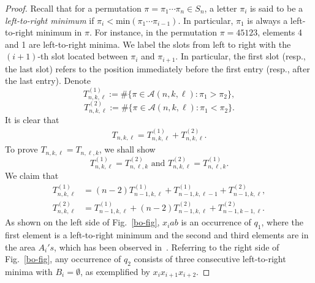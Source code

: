 \documentclass[12pt]{article}
\newcommand{\A}{\mathcal{A}}
\begin{document}
\begin{proof}
Recall that for a  permutation $\pi = \pi_1 \cdots \pi_n \in S_n$, a letter $\pi_i$ is said to be  a {\em left-to-right minimum} if $\pi_i < \mbox{min}(\pi_1 \cdots \pi_{i-1})$. In particular, $\pi_1$ is always a left-to-right minimum in $\pi$. For instance, in the permutation $\pi=45123$, elements 4 and 1 are left-to-right minima. We label the slots from left to right with the $(i+1)$-th slot located between $\pi_{i}$ and $\pi_{i+1}$. In particular, the first slot (resp., the last slot) refers to the position immediately before the first entry (resp., after the last entry). Denote
\[
T^{(1)}_{n,k,\ell}:=\# \{\pi \in \A(n,k,\ell):  \pi_1>\pi_2 \},
\]
\[
T^{(2)}_{n,k,\ell}:=\# \{\pi \in \A(n,k,\ell): \pi_1<\pi_2 \}.
\]
It is clear that 
\begin{align}\label{HK12}
T_{n,k,\ell}=T^{(1)}_{n,k,\ell}+T^{(2)}_{n,k,\ell}.
\end{align}
To prove $T_{n,k,\ell}=T_{n,\ell,k}$, we shall show
\[
T^{(1)}_{n,k,\ell}=T^{(2)}_{n,\ell,k}\text{ and } 
T^{(2)}_{n,k,\ell}=T^{(1)}_{n,\ell,k}.
\]
 We claim that
\begin{align}
T^{(1)}_{n,k,\ell}&=(n-2)T^{(1)}_{n-1,k,\ell}+T^{(1)}_{n-1,k,\ell-1}+T^{(2)}_{n-1,k,\ell},\label{A1_n,k,l}\\
T^{(2)}_{n,k,\ell}&=T^{(1)}_{n-1,k,\ell}+(n-2)T^{(2)}_{n-1,k,\ell}+T^{(2)}_{n-1,k-1,\ell}. \label{A2_n,k,l}
\end{align}
As shown on the left side of Fig.~\ref{bo-fig}, $x_iab$ is an occurrence of $q_1$, where the first element is a left-to-right minimum and the second and third elements are in the area 
$A_i's$, which has been observed in~\cite[Figure~1]{KLv}. 
Referring to the right side of Fig.~\ref{bo-fig}, any occurrence of $q_2$ consists of three consecutive left-to-right minima with $B_i=\emptyset$, as exemplified by $x_ix_{i+1}x_{i+2}$.


\end{proof}
\end{document}
